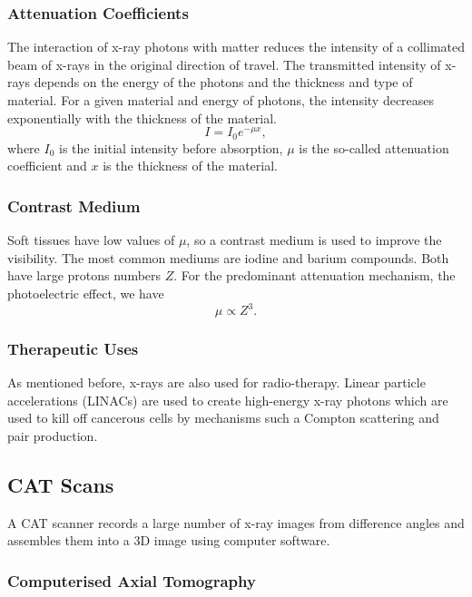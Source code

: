 \subsubsection*{Attenuation Coefficients}
The interaction of x-ray photons with matter reduces the intensity of a collimated beam of x-rays in the original direction of travel. The transmitted intensity of x-rays depends on the energy of the photons and the thickness and type of material. For a given material and energy  of photons, the intensity decreases exponentially with the thickness of the material.
\begin{equation}
    I = I_0 e^{-\mu x},
\end{equation}
where $I_0$ is the initial intensity before absorption, $\mu$ is the so-called attenuation coefficient and $x$ is the thickness of the material.  

\subsubsection*{Contrast Medium}

Soft tissues have low values of $\mu$, so a contrast medium is used to improve the visibility. The most common mediums are iodine and barium compounds. Both have large protons numbers $Z$. For the predominant attenuation mechanism, the photoelectric effect, we have
\begin{equation}
    \mu \propto Z^3.
\end{equation}

\subsubsection*{Therapeutic Uses}

As mentioned before, x-rays are also used for radio-therapy. Linear particle accelerations (LINACs) are used to create high-energy x-ray photons which are used to kill off cancerous cells by mechanisms such a Compton scattering and pair production. 

\subsection{CAT Scans}

A CAT scanner records a large number of x-ray images from difference angles and assembles them into a $3$D image using computer software.

\subsubsection*{Computerised Axial Tomography}

